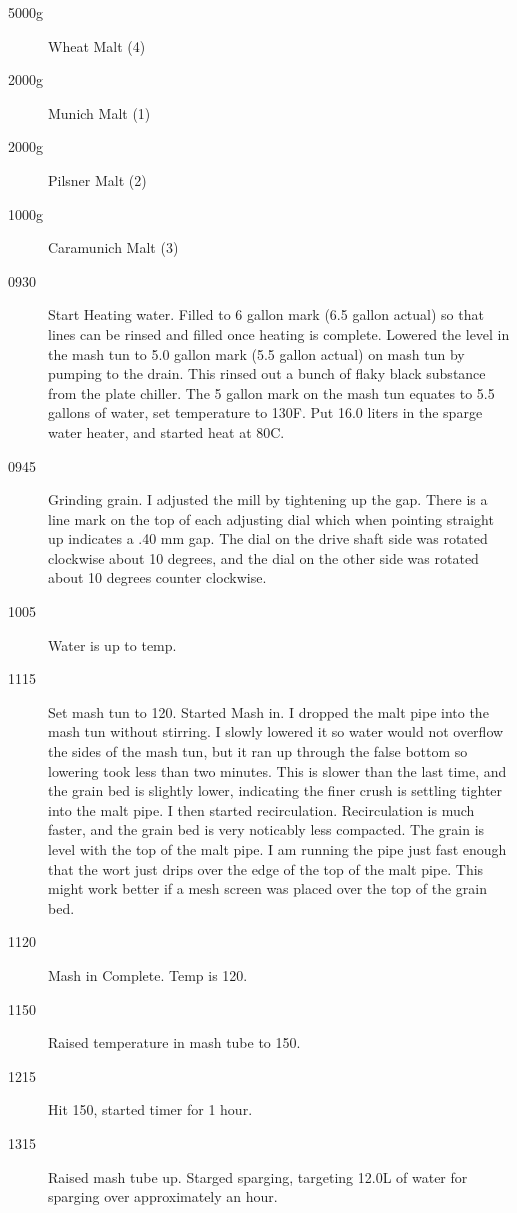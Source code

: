\begin{description}
    \item[5000g] Wheat Malt (4)
    \item[2000g] Munich Malt (1)
    \item[2000g] Pilsner Malt (2)
    \item[1000g] Caramunich Malt (3)
\end{description}

\begin{description}
    \item[0930] Start Heating water.  Filled to 6 gallon mark (6.5 gallon actual) so that lines can be rinsed and filled once heating is complete. Lowered the level in the mash tun to 5.0 gallon mark (5.5 gallon actual) on mash tun by pumping to the drain.  This rinsed out a bunch of flaky black substance from the plate chiller.  The 5 gallon mark on the mash tun equates to 5.5 gallons of water, set temperature to 130F.  Put 16.0 liters in the sparge water heater, and started heat at 80C.  
    \item[0945] Grinding grain.  I adjusted the mill by tightening up the gap.  There is a line mark on the top of each adjusting dial which when pointing straight up indicates a .40 mm gap. The dial on the drive shaft side was rotated clockwise about 10 degrees, and the dial on the other side was rotated about 10 degrees counter clockwise.
    \item[1005] Water is up to temp.
    \item[1115] Set mash tun to 120. Started Mash in.  I dropped the malt pipe into the mash tun without stirring.  I slowly lowered it so water would not overflow the sides of the mash tun, but it ran up through the false bottom so lowering took less than two minutes.  This is slower than the last time, and the grain bed is slightly lower, indicating the finer crush is settling tighter into the malt pipe.  I then started recirculation.  Recirculation is much faster, and the grain bed is very noticably less compacted.  The grain is level with the top of the malt pipe.  I am running the pipe just fast enough that the wort just drips over the edge of the top of the malt pipe.  This might work better if a mesh screen was placed over the top of the grain bed.
    \item[1120] Mash in Complete. Temp is 120.
    \item[1150] Raised temperature in mash tube to 150.
    \item[1215] Hit 150, started timer for 1 hour.
    \item[1315] Raised mash tube up. Starged sparging, targeting 12.0L of water for sparging over approximately an hour.  

\end{description}
